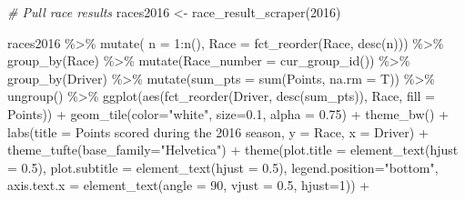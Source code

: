 \documentclass[
]{book}
\newenvironment{Shaded}{\begin{snugshade}}{\end{snugshade}}
\newcommand{\AttributeTok}[1]{\textcolor[rgb]{0.77,0.63,0.00}{#1}}
\newcommand{\CommentTok}[1]{\textcolor[rgb]{0.56,0.35,0.01}{\textit{#1}}}
\newcommand{\DecValTok}[1]{\textcolor[rgb]{0.00,0.00,0.81}{#1}}
\newcommand{\FloatTok}[1]{\textcolor[rgb]{0.00,0.00,0.81}{#1}}
\newcommand{\FunctionTok}[1]{\textcolor[rgb]{0.00,0.00,0.00}{#1}}
\newcommand{\NormalTok}[1]{#1}
\newcommand{\OtherTok}[1]{\textcolor[rgb]{0.56,0.35,0.01}{#1}}
\newcommand{\SpecialCharTok}[1]{\textcolor[rgb]{0.00,0.00,0.00}{#1}}
\newcommand{\StringTok}[1]{\textcolor[rgb]{0.31,0.60,0.02}{#1}}
\begin{document}
\begin{Shaded}
\begin{Highlighting}[]
\CommentTok{\# Pull race results}
\NormalTok{races2016 }\OtherTok{\textless{}{-}} \FunctionTok{race\_result\_scraper}\NormalTok{(}\DecValTok{2016}\NormalTok{)}

\NormalTok{races2016 }\SpecialCharTok{\%\textgreater{}\%}
  \FunctionTok{mutate}\NormalTok{( }\AttributeTok{n =} \DecValTok{1}\SpecialCharTok{:}\FunctionTok{n}\NormalTok{(),}
          \AttributeTok{Race =} \FunctionTok{fct\_reorder}\NormalTok{(Race, }\FunctionTok{desc}\NormalTok{(n))) }\SpecialCharTok{\%\textgreater{}\%}
  \FunctionTok{group\_by}\NormalTok{(Race) }\SpecialCharTok{\%\textgreater{}\%} 
  \FunctionTok{mutate}\NormalTok{(}\AttributeTok{Race\_number =} \FunctionTok{cur\_group\_id}\NormalTok{()) }\SpecialCharTok{\%\textgreater{}\%}
  \FunctionTok{group\_by}\NormalTok{(Driver) }\SpecialCharTok{\%\textgreater{}\%} 
  \FunctionTok{mutate}\NormalTok{(}\AttributeTok{sum\_pts =} \FunctionTok{sum}\NormalTok{(Points, }\AttributeTok{na.rm =}\NormalTok{ T)) }\SpecialCharTok{\%\textgreater{}\%}
  \FunctionTok{ungroup}\NormalTok{() }\SpecialCharTok{\%\textgreater{}\%} 
  \FunctionTok{ggplot}\NormalTok{(}\FunctionTok{aes}\NormalTok{(}\FunctionTok{fct\_reorder}\NormalTok{(Driver, }\FunctionTok{desc}\NormalTok{(sum\_pts)), Race, }\AttributeTok{fill =}\NormalTok{ Points)) }\SpecialCharTok{+}
  \FunctionTok{geom\_tile}\NormalTok{(}\AttributeTok{color=}\StringTok{"white"}\NormalTok{, }\AttributeTok{size=}\FloatTok{0.1}\NormalTok{, }\AttributeTok{alpha =} \FloatTok{0.75}\NormalTok{) }\SpecialCharTok{+}
  \FunctionTok{theme\_bw}\NormalTok{() }\SpecialCharTok{+}
  \FunctionTok{labs}\NormalTok{(}\AttributeTok{title =} \StringTok{\textquotesingle{}Points scored during the 2016 season\textquotesingle{}}\NormalTok{,}
       \AttributeTok{y =} \StringTok{\textquotesingle{}Race\textquotesingle{}}\NormalTok{,}
       \AttributeTok{x =} \StringTok{\textquotesingle{}Driver\textquotesingle{}}\NormalTok{) }\SpecialCharTok{+} 
  \FunctionTok{theme\_tufte}\NormalTok{(}\AttributeTok{base\_family=}\StringTok{"Helvetica"}\NormalTok{)  }\SpecialCharTok{+}
  \FunctionTok{theme}\NormalTok{(}\AttributeTok{plot.title =} \FunctionTok{element\_text}\NormalTok{(}\AttributeTok{hjust =} \FloatTok{0.5}\NormalTok{),}
        \AttributeTok{plot.subtitle =} \FunctionTok{element\_text}\NormalTok{(}\AttributeTok{hjust =} \FloatTok{0.5}\NormalTok{),}
        \AttributeTok{legend.position=}\StringTok{"bottom"}\NormalTok{,}
        \AttributeTok{axis.text.x =} \FunctionTok{element\_text}\NormalTok{(}\AttributeTok{angle =} \DecValTok{90}\NormalTok{, }\AttributeTok{vjust =} \FloatTok{0.5}\NormalTok{, }\AttributeTok{hjust=}\DecValTok{1}\NormalTok{)) }\SpecialCharTok{+}

\end{Highlighting}
\end{Shaded}
\end{document}
